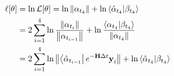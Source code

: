 \begin{definition}
\begin{align*}
        \ell[\theta] &= \ln \mathcal{L}[\theta] = \ln{\left\lVert\alpha_{t_{4}}\right\rVert} + \ln{\left < \hat{\alpha}_{t_{4}} | \beta_{t_{4}} \right >} \\  
        & =2 \sum_{i=1}^{4} \ln{\frac{\left\lVert\alpha_{t_{i}}\right\rVert}{\left\lVert\alpha_{t_{i-1}}\right\rVert}} + \ln{\frac{ \left < \alpha_{t_{4}} | \beta_{t_{4}}\right>}{\left\lVert\alpha_{t_{4}}\right\rVert}} \\ 
        & = 2 \sum_{i=1}^{4} \ln{\left\lVert\left< \hat{\alpha}_{t_{i-1}} \right| e^{-\textbf{H}\Delta t} \textbf{y}_i\right\rVert} + \ln{\left < \hat{\alpha}_{t_{4}} | \beta_{t_{4}} \right >} 
\end{align*}
\end{definition}